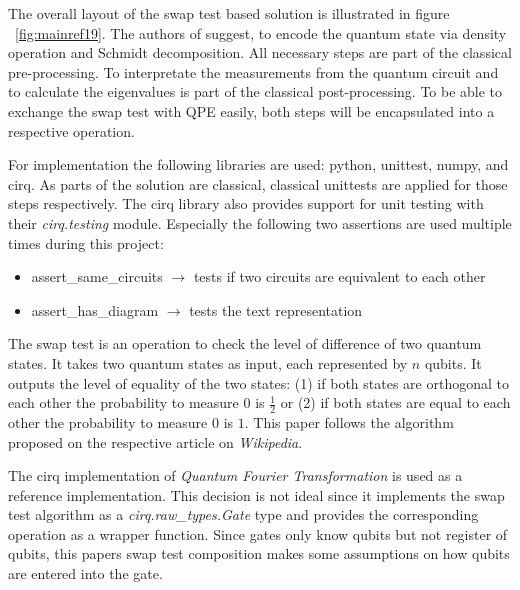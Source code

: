 The overall layout of the swap test based solution is illustrated in figure ~\ref{fig:mainref19}. The authors of \cite{Lokho_2020} suggest, to encode the quantum state via density operation and Schmidt decomposition. All necessary steps are part of the classical pre-processing. To interpretate the measurements from the quantum circuit and to calculate the eigenvalues is part of the classical post-processing. To be able to exchange the swap test with QPE easily, both steps will be encapsulated into a respective operation.

For implementation the following libraries are used: python, unittest, numpy, and cirq. As parts of the solution are classical, classical unittests are applied for those steps respectively. The cirq library also provides support for unit testing with their \emph{cirq.testing} module. Especially the following two assertions are used multiple times during this project:
\begin{itemize}
  \item assert\_same\_circuits $\rightarrow$ tests if two circuits are equivalent to each other
  \item assert\_has\_diagram $\rightarrow$ tests the text representation
\end{itemize}

The swap test is an operation to check the level of difference of two quantum states. It takes two quantum states as input, each represented by $n$ qubits. It outputs the level of equality of the two states: (1) if both states are orthogonal to each other the probability to measure $0$ is $\frac{1}{2}$ or (2) if both states are equal to each other the probability to measure $0$ is $1$. This paper follows the algorithm proposed on the respective article on \emph{Wikipedia}. \cite{Wp_Swap}

The cirq implementation of \emph{Quantum Fourier Transformation} \cite{Cirq_Qft} is used as a reference implementation. This decision is not ideal since it implements the swap test algorithm as a \emph{cirq.raw\_types.Gate} type and provides the corresponding operation as a wrapper function. Since gates only know qubits but not register of qubits, this papers swap test composition makes some assumptions on how qubits are entered into the gate.

